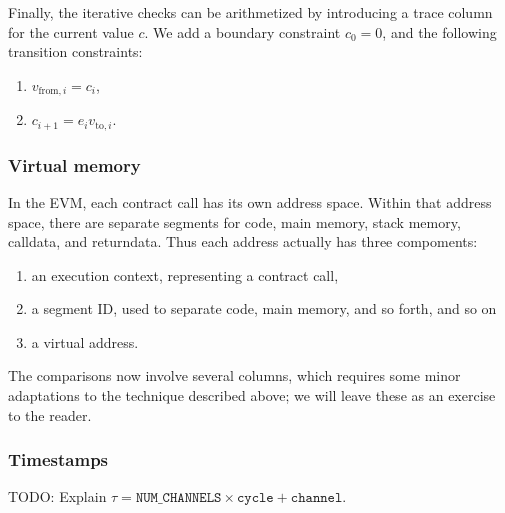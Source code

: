 Finally, the iterative checks can be arithmetized by introducing a trace column for the current value $c$. We add a boundary constraint $c_0 = 0$, and the following transition constraints:
\begin{enumerate}
  \item $v_{\text{from},i} = c_i$,
  \item $c_{i + 1} = e_i v_{\text{to},i}$.
\end{enumerate}


\subsubsection{Virtual memory}

In the EVM, each contract call has its own address space. Within that address space, there are separate segments for code, main memory, stack memory, calldata, and returndata. Thus each address actually has three compoments:
\begin{enumerate}
  \item an execution context, representing a contract call,
  \item a segment ID, used to separate code, main memory, and so forth, and so on
  \item a virtual address.
\end{enumerate}
The comparisons now involve several columns, which requires some minor adaptations to the technique described above; we will leave these as an exercise to the reader.


\subsubsection{Timestamps}

TODO: Explain $\tau = \texttt{NUM\_CHANNELS} \times \texttt{cycle} + \texttt{channel}$.

